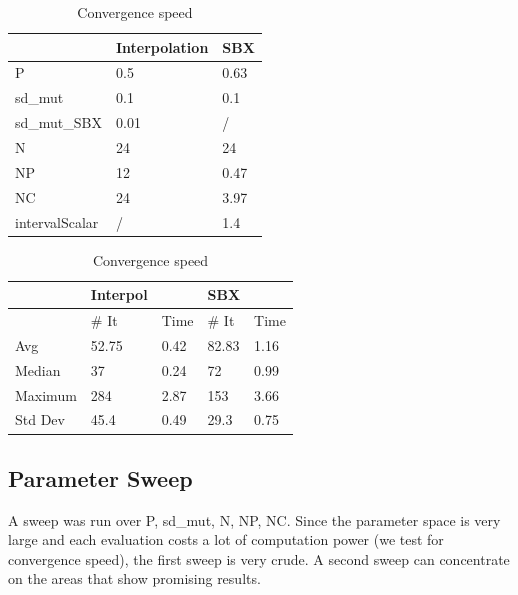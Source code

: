 \begin{table}[!htb]
	\caption{Convergence of the GAs}
	\begin{minipage}{.5\linewidth}
		\caption{Parameters}
		\centering
		\begin{tabular}{ | l | l | l | }
			\hline
			& Interpolation 	 & SBX \\
			\hline
			P			& 0.5	 &  0.63  \\
			sd_mut 		& 0.1	 & 0.1	\\
			sd_mut_SBX	& 0.01	 &  /  \\
			N        	& 24 	 & 24	\\
			NP 			& 12	 &  0.47\\
			NC 			& 24	 & 3.97 \\
			intervalScalar & /	 &  1.4 \\  
			\hline
		\end{tabular}
	\end{minipage}%
	\begin{minipage}{.5\linewidth}
		\centering
		\caption{Convergence speed}
		\begin{tabular}{ |l||l|l|| l | l |}
				\hline
							& Interpol &      & SBX  &\\
				\hline
							& \# It & Time 	& \# It & Time	\\
				\hline
				Avg			& 52.75	 	&  0.42  	& 82.83		 & 1.16		\\
				Median		& 37		&  0.24		& 72		& 0.99		\\
				Maximum		& 284	 	&  2.87		& 153		& 3.66		\\
				Std Dev		& 45.4	 	&  0.49 	& 29.3		& 0.75		\\
				\hline
		\end{tabular}
	\end{minipage} 
\end{table}


\subsection{Parameter Sweep}
A sweep was run over P, sd_mut, N, NP, NC. Since the parameter space is very large and each evaluation costs a lot of computation power (we test for convergence speed), the first sweep is very crude.
A second sweep can concentrate on the areas that show promising results.

